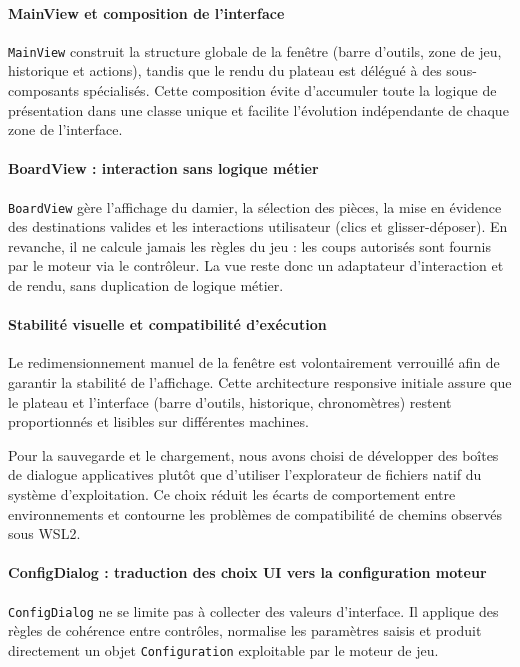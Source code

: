 \documentclass[a4paper]{article}
\begin{document}
\paragraph{MainView et composition de l'interface}

\texttt{MainView} construit la structure globale de la fenêtre (barre d'outils, zone de jeu, historique et actions), tandis que le rendu du plateau est délégué à des sous-composants spécialisés. Cette composition évite d'accumuler toute la logique de présentation dans une classe unique et facilite l'évolution indépendante de chaque zone de l'interface.

\paragraph{BoardView : interaction sans logique métier}

\texttt{BoardView} gère l'affichage du damier, la sélection des pièces, la mise en évidence des destinations valides et les interactions utilisateur (clics et glisser-déposer). En revanche, il ne calcule jamais les règles du jeu : les coups autorisés sont fournis par le moteur via le contrôleur. La vue reste donc un adaptateur d'interaction et de rendu, sans duplication de logique métier.

\paragraph{Stabilité visuelle et compatibilité d'exécution}

Le redimensionnement manuel de la fenêtre est volontairement verrouillé afin de garantir la stabilité de l'affichage. Cette architecture responsive initiale assure que le plateau et l'interface (barre d'outils, historique, chronomètres) restent proportionnés et lisibles sur différentes machines.

Pour la sauvegarde et le chargement, nous avons choisi de développer des boîtes de dialogue applicatives plutôt que d'utiliser l'explorateur de fichiers natif du système d'exploitation. Ce choix réduit les écarts de comportement entre environnements et contourne les problèmes de compatibilité de chemins observés sous WSL2.

\paragraph{ConfigDialog : traduction des choix UI vers la configuration moteur}

\texttt{ConfigDialog} ne se limite pas à collecter des valeurs d'interface. Il applique des règles de cohérence entre contrôles, normalise les paramètres saisis et produit directement un objet \texttt{Configuration} exploitable par le moteur de jeu.
\end{document}
